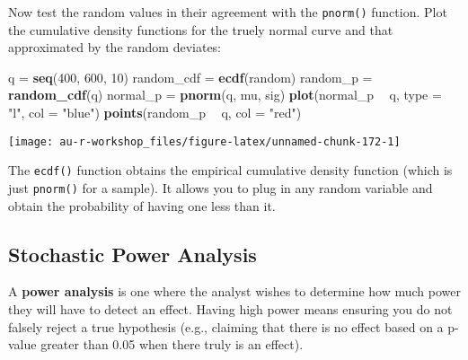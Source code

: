 \documentclass[]{book}
\newenvironment{Shaded}{\begin{snugshade}}{\end{snugshade}}
\newcommand{\KeywordTok}[1]{\textcolor[rgb]{0.13,0.29,0.53}{\textbf{#1}}}
\newcommand{\DataTypeTok}[1]{\textcolor[rgb]{0.13,0.29,0.53}{#1}}
\newcommand{\DecValTok}[1]{\textcolor[rgb]{0.00,0.00,0.81}{#1}}
\newcommand{\StringTok}[1]{\textcolor[rgb]{0.31,0.60,0.02}{#1}}
\newcommand{\OperatorTok}[1]{\textcolor[rgb]{0.81,0.36,0.00}{\textbf{#1}}}
\newcommand{\NormalTok}[1]{#1}
\theoremstyle{definition}
\theoremstyle{definition}
\theoremstyle{definition}
\theoremstyle{remark}
\begin{document}
Now test the random values in their agreement with the \texttt{pnorm()}
function. Plot the cumulative density functions for the truely normal
curve and that approximated by the random deviates:

\begin{Shaded}
\begin{Highlighting}[]
\NormalTok{q =}\StringTok{ }\KeywordTok{seq}\NormalTok{(}\DecValTok{400}\NormalTok{, }\DecValTok{600}\NormalTok{, }\DecValTok{10}\NormalTok{)}
\NormalTok{random_cdf =}\StringTok{ }\KeywordTok{ecdf}\NormalTok{(random)}
\NormalTok{random_p =}\StringTok{ }\KeywordTok{random_cdf}\NormalTok{(q)}
\NormalTok{normal_p =}\StringTok{ }\KeywordTok{pnorm}\NormalTok{(q, mu, sig)}
\KeywordTok{plot}\NormalTok{(normal_p }\OperatorTok{~}\StringTok{ }\NormalTok{q, }\DataTypeTok{type =} \StringTok{"l"}\NormalTok{, }\DataTypeTok{col =} \StringTok{"blue"}\NormalTok{)}
\KeywordTok{points}\NormalTok{(random_p }\OperatorTok{~}\StringTok{ }\NormalTok{q, }\DataTypeTok{col =} \StringTok{"red"}\NormalTok{)}
\end{Highlighting}
\end{Shaded}

\begin{center}\texttt{[image: au-r-workshop\_files/figure-latex/unnamed-chunk-172-1]} \end{center}

The \texttt{ecdf()} function obtains the empirical cumulative density
function (which is just \texttt{pnorm()} for a sample). It allows you to
plug in any random variable and obtain the probability of having one
less than it.

\subsection{Stochastic Power Analysis}\label{power-ex}

A \textbf{power analysis} is one where the analyst wishes to determine
how much power they will have to detect an effect. Having high power
means ensuring you do not falsely reject a true hypothesis (e.g.,
claiming that there is no effect based on a p-value greater than 0.05
when there truly is an effect).
\end{document}
